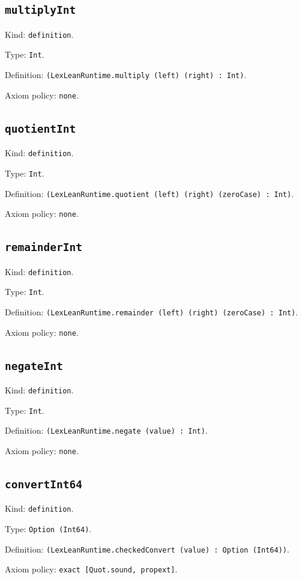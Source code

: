 \documentclass[11pt]{article}
\begin{document}
\subsection*{\texttt{multiplyInt}}
\noindent Kind: \texttt{definition}.\par
\noindent Type: \texttt{Int}.\par
\noindent Definition: \texttt{(LexLeanRuntime.multiply (left) (right) : Int)}.\par
\noindent Axiom policy: \texttt{none}.\par
\subsection*{\texttt{quotientInt}}
\noindent Kind: \texttt{definition}.\par
\noindent Type: \texttt{Int}.\par
\noindent Definition: \texttt{(LexLeanRuntime.quotient (left) (right) (zeroCase) : Int)}.\par
\noindent Axiom policy: \texttt{none}.\par
\subsection*{\texttt{remainderInt}}
\noindent Kind: \texttt{definition}.\par
\noindent Type: \texttt{Int}.\par
\noindent Definition: \texttt{(LexLeanRuntime.remainder (left) (right) (zeroCase) : Int)}.\par
\noindent Axiom policy: \texttt{none}.\par
\subsection*{\texttt{negateInt}}
\noindent Kind: \texttt{definition}.\par
\noindent Type: \texttt{Int}.\par
\noindent Definition: \texttt{(LexLeanRuntime.negate (value) : Int)}.\par
\noindent Axiom policy: \texttt{none}.\par
\subsection*{\texttt{convertInt64}}
\noindent Kind: \texttt{definition}.\par
\noindent Type: \texttt{Option (Int64)}.\par
\noindent Definition: \texttt{(LexLeanRuntime.checkedConvert (value) : Option (Int64))}.\par
\noindent Axiom policy: \texttt{exact [Quot.sound, propext]}.\par
\end{document}
